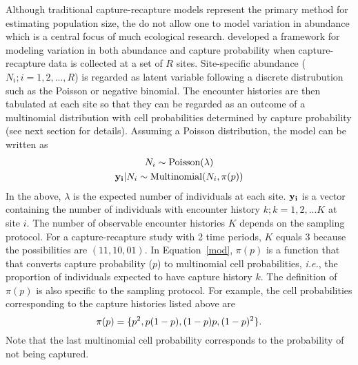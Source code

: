 \documentclass[a4paper]{article}
\begin{document}
Although traditional capture-recapture models represent the primary
method for estimating population size, the do not allow one to model
variation in abundance which is a central focus of much ecological
research.
\citet{royle_generalized_2004} developed a framework for
modeling variation in both abundance and capture
probability when capture-recapture data is collected at a set of
$R$ sites. Site-specific abundance ($N_i; i=1,2,...,R$) is regarded
as latent variable following a discrete distrubution such as the
Poisson or negative binomial. The encounter histories are then
tabulated at each site so that they can be regarded as an outcome of a
multinomial distribution with cell probabilities determined by capture
probability (see next section for details). Assuming a Poisson
distribution, the model can be written as
\begin{gather}
  N_i \sim \mbox{Poisson}(\lambda) \nonumber \\
  {\bf y_i}|N_i \sim \mbox{Multinomial}(N_i, \pi(p))
  \label{mod}
\end{gather}
In the above, $\lambda$ is the expected number of individuals at each
site. ${\bf y_i}$ is a vector containing the number of
individuals with encounter history $k; k=1,2,...K$ at site $i$. The
number of observable encounter histories $K$ depends on the sampling
protocol. For a capture-recapture study with 2 time periods, $K$
equals 3 because the possibilities are $(11, 10, 01)$. In Equation~\ref{mod},
$\pi(p)$ is a function that that converts capture probability ($p$) to
multinomial cell probabilities, \emph{i.e.}, the proportion
of individuals expected to have capture history $k$. The definition of
$\pi(p)$ is also specific to the sampling protocol. For example, the
cell probabilities corresponding to the capture histories listed above
are
\[
{\bold \pi(p)} = \{p^2, p(1-p), (1-p)p, (1-p)^2\}.
\]
Note that the last multinomial cell probability corresponds to the
probability of not being captured.
\end{document}
